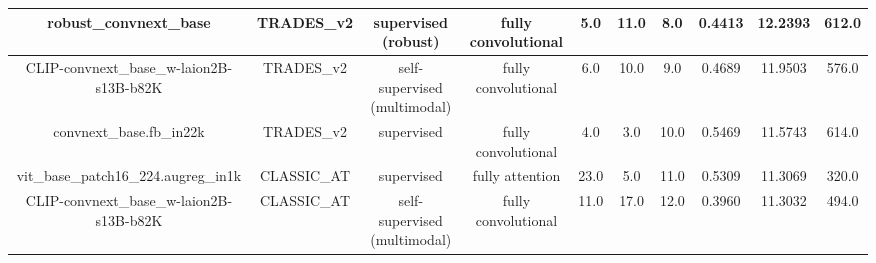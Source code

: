 \begin{table}[ht]
{\begin{tabular}{|c|c|c|c|c|c|c|c|c|c|}
\hline
                            robust\_convnext\_base &  TRADES\_v2 &          supervised (robust) & fully convolutional &                 5.0 &               11.0 &                      8.0 &               0.4413 &             12.2393 &                     612.0 \\
\hline
          CLIP-convnext\_base\_w-laion2B-s13B-b82K &  TRADES\_v2 & self-supervised (multimodal) & fully convolutional &                 6.0 &               10.0 &                      9.0 &               0.4689 &             11.9503 &                     576.0 \\
\hline
                          convnext\_base.fb\_in22k &  TRADES\_v2 &                   supervised & fully convolutional &                 4.0 &                3.0 &                     10.0 &               0.5469 &             11.5743 &                     614.0 \\
\hline
              vit\_base\_patch16\_224.augreg\_in1k & CLASSIC\_AT &                   supervised &     fully attention &                23.0 &                5.0 &                     11.0 &               0.5309 &             11.3069 &                     320.0 \\
\hline
          CLIP-convnext\_base\_w-laion2B-s13B-b82K & CLASSIC\_AT & self-supervised (multimodal) & fully convolutional &                11.0 &               17.0 &                     12.0 &               0.3960 &             11.3032 &                     494.0 \\
\hline
\hline
\hline
\end{tabular}
}
\end{table}